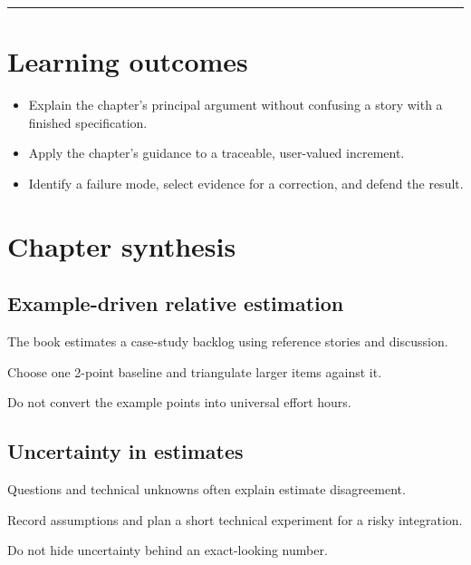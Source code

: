 \documentclass[11pt,letterpaper]{article}
\begin{document}
\tableofcontents\medskip\noindent\rule{\linewidth}{0.4pt}\medskip
\section{Learning outcomes}
\begin{itemize}[leftmargin=*,itemsep=2pt]
\item Explain the chapter's principal argument without confusing a story with a finished specification.
\item Apply the chapter's guidance to a traceable, user-valued increment.
\item Identify a failure mode, select evidence for a correction, and defend the result.
\end{itemize}
\section{Chapter synthesis}
\subsection{Example-driven relative estimation}
The book estimates a case-study backlog using reference stories and discussion.

\begin{tcolorbox}[colback=tealback,colframe=navy,title={Engineering translation},breakable]
Choose one 2-point baseline and triangulate larger items against it.

\end{tcolorbox}
\begin{tcolorbox}[colback=amberback,colframe=navy,title={Failure mode to watch},breakable]
Do not convert the example points into universal effort hours.

\end{tcolorbox}
\subsection{Uncertainty in estimates}
Questions and technical unknowns often explain estimate disagreement.

\begin{tcolorbox}[colback=tealback,colframe=navy,title={Engineering translation},breakable]
Record assumptions and plan a short technical experiment for a risky integration.

\end{tcolorbox}
\begin{tcolorbox}[colback=amberback,colframe=navy,title={Failure mode to watch},breakable]
Do not hide uncertainty behind an exact-looking number.

\end{tcolorbox}
\end{document}
